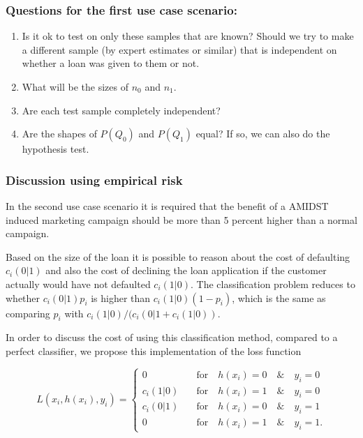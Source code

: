 \documentclass{article}
\theoremstyle{theorem}
\theoremstyle{definition}
\begin{document}
\subsubsection*{Questions for the first use case scenario: }
\begin{enumerate}
\item Is it ok to test on only these samples that are known?  Should we try to make a different sample (by expert estimates or similar) that is independent on whether a loan was given to them or not. 
\item What will be the sizes of $n_0$ and $n_1$.
\item Are each test sample completely independent?
\item Are the shapes of $P(Q_0)$ and $P(Q_1)$ equal? If so, we can also do the hypothesis test.
\end{enumerate}

\subsubsection*{Discussion using empirical risk}

In the second use case scenario it is required that the benefit of a AMIDST induced marketing campaign should be more than 5 percent higher than a normal campaign. 

Based on the size of the loan it is possible to reason about the cost of defaulting $c_i(0|1)$ and also the cost of declining the loan application if the customer actually would have not defaulted $c_i(1|0)$.  The classification problem reduces to whether $c_i(0|1)p_i$ is higher than $c_i(1|0)(1-p_i)$, which is the same as comparing $p_i$ with $c_i(1|0)/(c_i(0|1 + c_i(1|0))$. 

In order to discuss the cost of using this classification method, compared to a perfect classifier, we propose this implementation of the loss function

\begin{equation}
\label{def:empRiskBank}
L(x_i, h(x_i), y_i) = 
\begin{cases}
0     &\quad \mbox{for} \quad h(x_i) = 0 \quad \& \quad y_i = 0\\
c_i(1|0)    &\quad \mbox{for} \quad h(x_i) = 1 \quad \& \quad y_i = 0\\
c_i(0|1)      &\quad \mbox{for} \quad h(x_i) = 0 \quad \& \quad y_i = 1\\
0   &\quad \mbox{for} \quad h(x_i) = 1 \quad \& \quad y_i = 1.
\end{cases}
\end{equation}
\end{document}
